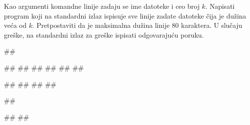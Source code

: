 


\begin{Exercise}[label=p3_03] 
 Kao argumenti komandne linije zadaju se ime datoteke i ceo broj $k$. 
 Napisati program koji na  standardni izlaz ispisuje sve linije zadate datoteke čija je dužina veća od $k$. 
 Pretpostaviti da je maksimalna dužina linije $80$ karaktera.
 U slučaju greške, na standardni izlaz za greške ispisati odgovarajuću poruku.

\begin{miditest}
\begin{upotreba}{1}
##

##
##
##
##
##
##

#\naslovIzlaz#
##
##
##
\end{upotreba}
\end{miditest}
\begin{miditest}
\begin{upotreba}{2}
##

#\naslovIzlazZaGresku#
##
\end{upotreba}
\end{miditest}
\end{Exercise}
\begin{Answer}[ref=p3_03]
\end{Answer}


